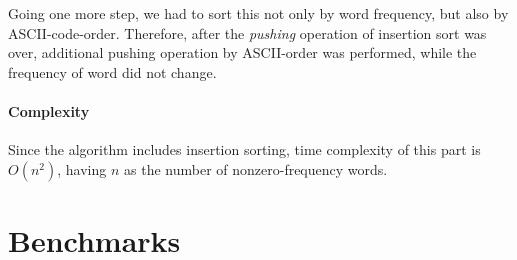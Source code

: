 \documentclass[11pt]{article}
\begin{document}
	Going one more step, we had to sort this not only by word frequency, but also by ASCII-code-order. Therefore, after the \textit{pushing} operation of insertion sort was over, additional pushing operation by ASCII-order was performed, while the frequency of word did not change.
	
	\paragraph{Complexity}
	Since the algorithm includes insertion sorting, time complexity of this part is $ O(n^2) $, having $ n $ as the number of nonzero-frequency words.
	\\
	
	\section{Benchmarks}
	
	
	
	
	
	
	
	
	
	
	
	
\end{document}
